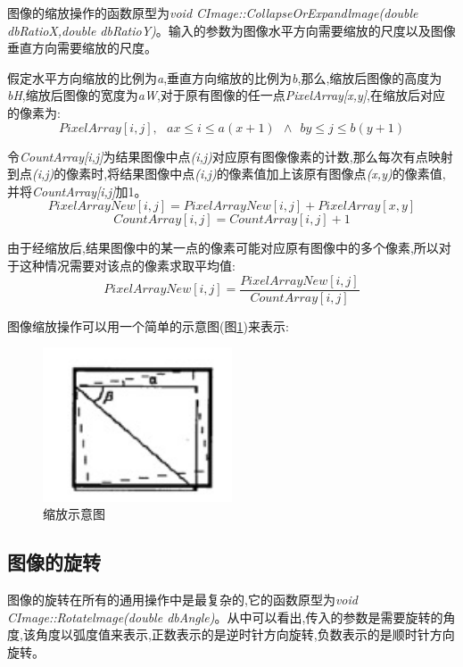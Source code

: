 \documentclass{XDBAthesis}
\begin{document}
    图像的缩放操作的函数原型为\emph{void CImage::CollapseOrExpandlmage(double dbRatioX,double dbRatioY)}。输入的参数为图像水平方向需要缩放的尺度以及图像垂直方向需要缩放的尺度。

假定水平方向缩放的比例为\emph{a},垂直方向缩放的比例为\emph{b},那么,缩放后图像的高度为\emph{bH},缩放后图像的宽度为\emph{aW},对于原有图像的任一点\emph{PixelArray[x,y]},在缩放后对应的像素为:
$$
    PixelArray[i,j] ,\ \ \ ax\leq i \leq a(x+1) \ \ \wedge\ \  by \leq j \leq b(y+1)
$$


    令\emph{CountArray[i,j]}为结果图像中点\emph{(i,j)}对应原有图像像素的计数,那么每次有点映射到点\emph{(i,j)}的像素时,将结果图像中点\emph{(i,j)}的像素值加上该原有图像点\emph{(x,y)}的像素值,并将\emph{CountArray[i,j]}加1。
$$
    PixelArrayNew[i,j]=PixelArrayNew[i,j]+PixelArray[x,y]
$$
$$
    CountArray[i,j]=CountArray[i,j]+1
$$

由于经缩放后,结果图像中的某一点的像素可能对应原有图像中的多个像素,所以对于这种情况需要对该点的像素求取平均值:
$$
    PixelArrayNew[i,j]=\frac{PixelArrayNew[i,j]}{CountArray[i,j]} %
$$


    图像缩放操作可以用一个简单的示意图(图\ref{fg:ss})来表示:
    
\begin{figure}[htb]
    \centering
    \includegraphics[width=0.5\textwidth]{figure/roat}
    \caption{缩放示意图}
    \label{fg:ss}
\end{figure}

\subsection{图像的旋转}

    图像的旋转在所有的通用操作中是最复杂的,它的函数原型为\emph{void CImage::Rotatelmage(double dbAngle)}。从中可以看出,传入的参数是需要旋转的角度,该角度以弧度值来表示,正数表示的是逆时针方向旋转,负数表示的是顺时针方向旋转。
\end{document}
